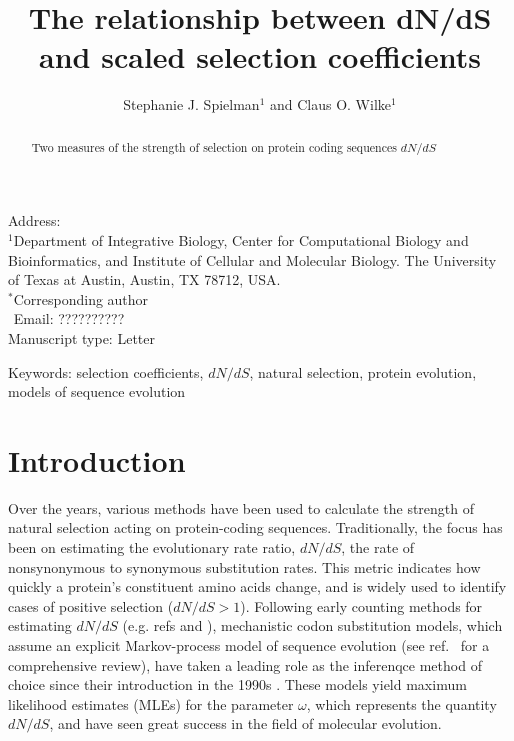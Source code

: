 \documentclass[11pt]{article}
\begin{document}
\title{\textbf{The relationship between dN/dS and scaled selection coefficients}}
\author{Stephanie J. Spielman$^{1}$ and Claus O. Wilke$^{1}$}
\date{}

\maketitle
\noindent
Address:\\
$^1$Department of Integrative Biology, Center for Computational Biology and Bioinformatics, and Institute of Cellular and Molecular Biology.
The University of Texas at Austin, Austin, TX 78712, USA.\\

\bigskip
\noindent
$^*$Corresponding author\\
$\phantom{^*}$Email: ??????????\\

\bigskip
\noindent
Manuscript type: Letter

\bigskip
\noindent Keywords: selection coefficients, $dN/dS$, natural selection, protein evolution, models of sequence evolution

\newpage
\begin{abstract}
Two measures of the strength of selection on protein coding sequences $dN/dS$
  
\end{abstract}


\section*{Introduction}

Over the years, various methods have been used to calculate the strength of natural selection acting on protein-coding sequences. Traditionally, the focus has been on estimating the evolutionary rate ratio, $dN/dS$, the rate of nonsynonymous to synonymous substitution rates. This metric indicates how quickly a protein's constituent amino acids change, and is widely used to identify cases of positive selection ($dN/dS > 1$). Following early counting methods for estimating $dN/dS$ (e.g. refs \cite{LWL85} and \cite{NG86}), mechanistic codon substitution models, which assume an explicit Markov-process model of sequence evolution (see ref.~\cite{Anisimova2009} for a comprehensive review), have taken a leading role as the inferenqce method of choice since their introduction in the 1990s \cite{GoldmanYang1994, MuseGaut1994, NielsenYang1998}. These models yield maximum likelihood estimates (MLEs) for the parameter $\omega$, which represents the quantity $dN/dS$, and have seen great success in the field of molecular evolution. 
\end{document}
